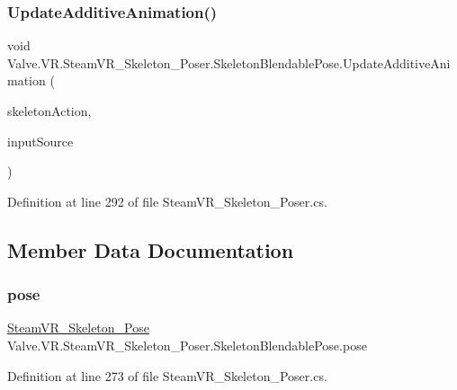 \subsubsection{\texorpdfstring{UpdateAdditiveAnimation()}{UpdateAdditiveAnimation()}}
{\footnotesize\ttfamily void Valve.\+V\+R.\+Steam\+V\+R\+\_\+\+Skeleton\+\_\+\+Poser.\+Skeleton\+Blendable\+Pose.\+Update\+Additive\+Animation (\begin{DoxyParamCaption}\item[{\mbox{\hyperlink{class_valve_1_1_v_r_1_1_steam_v_r___action___skeleton}{Steam\+V\+R\+\_\+\+Action\+\_\+\+Skeleton}}}]{skeleton\+Action,  }\item[{\mbox{\hyperlink{namespace_valve_1_1_v_r_a82e5bf501cc3aa155444ee3f0662853f}{Steam\+V\+R\+\_\+\+Input\+\_\+\+Sources}}}]{input\+Source }\end{DoxyParamCaption})}



Definition at line 292 of file Steam\+V\+R\+\_\+\+Skeleton\+\_\+\+Poser.\+cs.



\subsection{Member Data Documentation}
\mbox{\label{class_valve_1_1_v_r_1_1_steam_v_r___skeleton___poser_1_1_skeleton_blendable_pose_afe000b0d0e4e73ed4d18eb3d9195e30b}} 
\subsubsection{\texorpdfstring{pose}{pose}}
{\footnotesize\ttfamily \mbox{\hyperlink{class_valve_1_1_v_r_1_1_steam_v_r___skeleton___pose}{Steam\+V\+R\+\_\+\+Skeleton\+\_\+\+Pose}} Valve.\+V\+R.\+Steam\+V\+R\+\_\+\+Skeleton\+\_\+\+Poser.\+Skeleton\+Blendable\+Pose.\+pose}



Definition at line 273 of file Steam\+V\+R\+\_\+\+Skeleton\+\_\+\+Poser.\+cs.

\mbox{\label{class_valve_1_1_v_r_1_1_steam_v_r___skeleton___poser_1_1_skeleton_blendable_pose_aace0df11053b7fbd2c93115a64f2a7c6}} 
